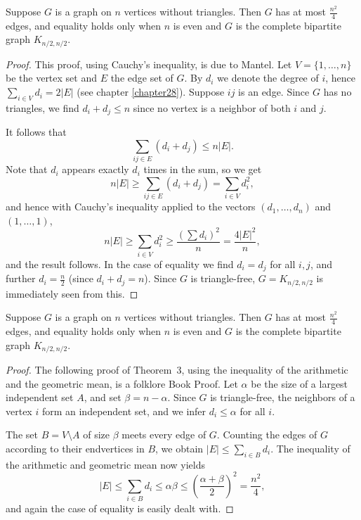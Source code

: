 \begin{theorem}
  \label{ch20theorem3proof1}
  Suppose $G$ is a graph on $n$ vertices without triangles. Then $G$
  has at most $\frac{n^2}{4}$ edges, and equality holds only when $n$ is even and $G$ is the
  complete bipartite graph $K_{n/2, n/2}$.
\end{theorem}
\begin{proof}
  This proof, using Cauchy's inequality, is due to Mantel.
  Let $V = \{1, \dots, n\}$ be the vertex set and $E$ the edge set of $G$.
  By $d_i$ we denote the degree of $i$, hence $\sum_{i \in V} d_i = 2|E|$
  (see chapter \ref{chapter28}). Suppose $ij$ is an edge.
  Since $G$ has no triangles, we find $d_i + d_j \leq n$ since no vertex is a
  neighbor of both $i$ and $j$.

  It follows that
  \[
  \sum_{ij \in E} (d_i + d_j) \leq n|E|.
  \]
  Note that $d_i$ appears exactly $d_i$ times in the sum, so we get
  \[
  n|E| \geq \sum_{ij \in E} (d_i + d_j) = \sum_{i \in V} d_i^2,
  \]
  and hence with Cauchy's inequality applied to the vectors $(d_1, \dots, d_n)$ and $(1, \dots, 1)$,
  \[
  n|E| \geq \sum_{i \in V} d_i^2 \geq \frac{\left( \sum d_i \right)^2}{n} = \frac{4|E|^2}{n},
  \]
  and the result follows. In the case of equality we find $d_i = d_j$ for all $i, j$, and further
  $d_i = \frac{n}{2}$ (since $d_i + d_j = n$). Since $G$ is triangle-free, $G = K_{n/2, n/2}$ is
  immediately seen from this.

\end{proof}

\begin{theorem}
  \label{ch20theorem3proof2}
  \leanok
  Suppose $G$ is a graph on $n$ vertices without triangles. Then $G$
  has at most $\frac{n^2}{4}$ edges, and equality holds only when $n$ is even and $G$ is the
  complete bipartite graph $K_{n/2, n/2}$.
\end{theorem}
\begin{proof}
  \leanok
  The following proof of Theorem~3, using the inequality of the arithmetic and the geometric mean,
  is a folklore Book Proof. Let $\alpha$ be the size of a largest independent set $A$, and set $\beta = n - \alpha$.
  Since $G$ is triangle-free, the neighbors of a vertex $i$ form an independent set, and we infer
  $d_i \le \alpha$ for all $i$.

  The set $B = V \setminus A$ of size $\beta$ meets every edge of $G$.
  Counting the edges of $G$ according to their endvertices in $B$, we obtain
  $|E| \le \sum_{i \in B} d_i$.
  The inequality of the arithmetic and geometric mean now yields
  \[
  |E| \le \sum_{i \in B} d_i \le \alpha\beta \le \left(\frac{\alpha + \beta}{2}\right)^2 = \frac{n^2}{4},
  \]
  and again the case of equality is easily dealt with.
\end{proof}
